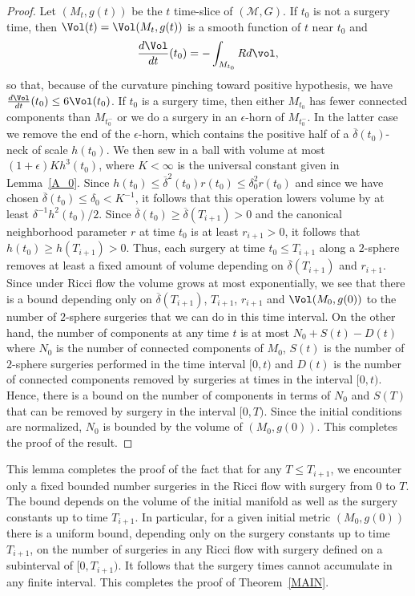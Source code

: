 \begin{proof}
Let $(M_t,g(t))$  be the $t$ time-slice of $({\mathcal M},G)$. If $t_0$ is not
a surgery time, then $\Vol(t)=\Vol(M_t,g(t))$ is a smooth function
of $t$ near $t_0$ and
$$\frac{d\Vol}{dt}(t_0)=-\int_{M_{t_0}}Rd\vol,$$ so that, because of the curvature
pinching toward positive hypothesis, we have $\frac{d\Vol}{dt}(t_0)\le
6\Vol(t_0)$. If $t_0$ is a surgery time, then either $M_{t_0}$ has fewer
connected components than  $M_{t_0^-}$ or we do a surgery in an $\epsilon$-horn
of $M_{t_0^-}$. In the latter case we remove the end of the $\epsilon$-horn,
which  contains the positive half of a $\overline\delta(t_0)$-neck of scale
$h(t_0)$. We then  sew in a ball with volume at most $(1+\epsilon)Kh^3(t_0)$,
where $K<\infty$ is the universal constant given in Lemma~\ref{A_0}. Since
$h(t_0)\le \overline\delta^2(t_0)r(t_0)\le \delta_0^2r(t_0)$ and since we have
chosen
 $\overline\delta(t_0)\le\delta_0<K^{-1}$, it follows that this
operation lowers volume by at least $\delta^{-1}h^2(t_0)/2$. Since
$\overline\delta(t_0)\ge \overline \delta(T_{i+1})>0$ and the canonical
neighborhood parameter $r$ at time $t_0$ is at least $r_{i+1}>0$, it follows
that $h(t_0)\ge h(T_{i+1})>0$. Thus, each surgery at time $ t_0\le T_{i+1}$
along a $2$-sphere removes at least a fixed amount of volume depending on
$\overline \delta(T_{i+1})$ and $r_{i+1}$. Since under Ricci flow the volume
grows at most exponentially, we see that there is a bound depending only on
$\overline\delta(T_{i+1})$, $T_{i+1}$, $r_{i+1}$ and $\Vol(M_0,g(0))$ to
the number of $2$-sphere surgeries that we can do in this time interval. On the
other hand, the number of components at any time $t$ is at most $N_0+S(t)-D(t)$
where $N_0$ is the number of connected components of $M_0$, $S(t)$ is the
number of $2$-sphere surgeries performed in the time interval $[0,t)$ and
$D(t)$ is the number of connected components removed by surgeries at times in
the interval $[0,t)$.  Hence, there is a bound on the number of components in
terms of $N_0$ and $S(T)$ that can be removed by surgery in the interval
$[0,T)$. Since the initial conditions are normalized, $N_0$ is bounded by the
volume of  $(M_0,g(0))$. This completes the proof of the result.
\end{proof}


This lemma completes the proof of the fact that for any $T\le T_{i+1}$, we
encounter only a fixed bounded number  surgeries in  the Ricci flow with
surgery from $0$ to $T$. The bound depends on the volume of the initial
manifold as well as the surgery constants up to time $T_{i+1}$. In particular,
for a given initial metric $(M_0,g(0))$ there is a uniform bound, depending
only on the surgery constants up to time $T_{i+1}$, on the number of surgeries
in any Ricci flow with surgery defined on a subinterval of $[0,T_{i+1})$. It
follows that the surgery times cannot accumulate in any finite interval. This
completes the proof of Theorem~\ref{MAIN}.


